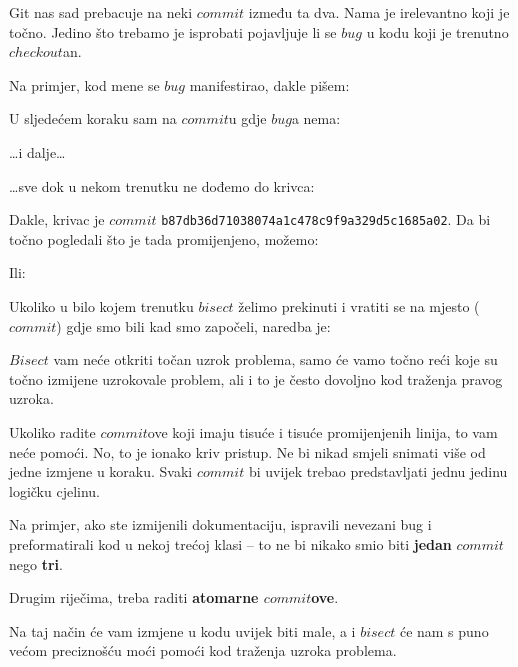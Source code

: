 Git nas sad prebacuje na neki $commit$ između ta dva.
Nama je irelevantno koji je točno.
Jedino što trebamo je isprobati pojavljuje li se $bug$ u kodu koji je trenutno $checkout$an.

Na primjer, kod mene se $bug$ manifestirao, dakle pišem:



U sljedećem koraku sam na $commit$u gdje $bug$a nema:



\dots{}i dalje\dots



\dots{}sve dok u nekom trenutku ne dođemo do krivca:



Dakle, krivac je $commit$ \verb+b87db36d71038074a1c478c9f9a329d5c1685a02+.
Da bi točno pogledali što je tada promijenjeno, možemo:


Ili:


Ukoliko u bilo kojem trenutku $bisect$ želimo prekinuti i vratiti se na mjesto ($commit$) gdje smo bili kad smo započeli, naredba je:



$Bisect$ vam neće otkriti točan uzrok problema, samo će vamo točno reći koje su točno izmijene uzrokovale problem, ali i to je često dovoljno kod traženja pravog uzroka. 

Ukoliko radite $commit$ove koji imaju tisuće i tisuće promijenjenih linija, to vam neće pomoći.
No, to je ionako kriv pristup.
Ne bi nikad smjeli snimati više od jedne izmjene u koraku.
Svaki $commit$ bi uvijek trebao predstavljati jednu jedinu logičku cjelinu.

Na primjer, ako ste izmijenili dokumentaciju, ispravili nevezani bug i preformatirali kod u nekoj trećoj klasi -- to ne bi nikako smio biti \textbf{jedan} $commit$ nego \textbf{tri}.

Drugim riječima, treba raditi \textbf{atomarne $commit$ove}.

Na taj način će vam izmjene u kodu uvijek biti male, a i $bisect$ će nam s puno većom preciznošću moći pomoći kod traženja uzroka problema.
